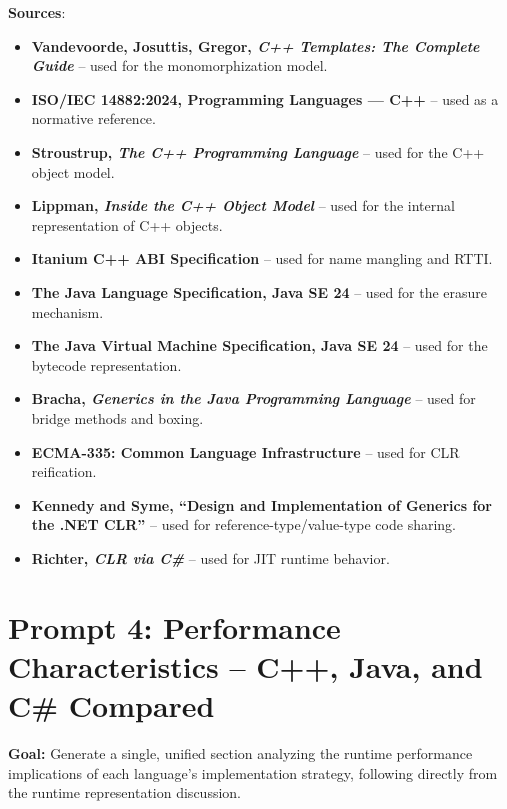 \documentclass[11pt]{report}
\begin{document}
\vspace{0.5em}
\noindent\textbf{Sources}:
\begin{itemize}
    \item \textbf{Vandevoorde, Josuttis, Gregor, \emph{C++ Templates: The Complete Guide}} \cite{cpp_templates2017} -- used for the monomorphization model.
    \item \textbf{ISO/IEC 14882:2024, Programming Languages --- C++} \cite{iso_cpp2024} -- used as a normative reference.
    \item \textbf{Stroustrup, \emph{The C++ Programming Language}} \cite{stroustrup2013} -- used for the C++ object model.
    \item \textbf{Lippman, \emph{Inside the C++ Object Model}} \cite{lippman1996} -- used for the internal representation of C++ objects.
    \item \textbf{Itanium C++ ABI Specification} \cite{itanium_abi} -- used for name mangling and RTTI.
    \item \textbf{The Java Language Specification, Java SE 24} \cite{jls2024} -- used for the erasure mechanism.
    \item \textbf{The Java Virtual Machine Specification, Java SE 24} \cite{jvms2024} -- used for the bytecode representation.
    \item \textbf{Bracha, \emph{Generics in the Java Programming Language}} \cite{bracha2004} -- used for bridge methods and boxing.
    \item \textbf{ECMA-335: Common Language Infrastructure} \cite{ecma335_2024} -- used for CLR reification.
    \item \textbf{Kennedy and Syme, ``Design and Implementation of Generics for the .NET CLR''} \cite{kennedy2001} -- used for reference-type/value-type code sharing.
    \item \textbf{Richter, \emph{CLR via C\#}} \cite{richter2012} -- used for JIT runtime behavior.
\end{itemize}

\section{Prompt 4: Performance Characteristics -- C++, Java, and C\# Compared}
\label{Prompt 4 Performance}

\noindent\textbf{Goal:} Generate a single, unified section analyzing the runtime performance implications of each language's implementation strategy, following directly from the runtime representation discussion.
\end{document}
